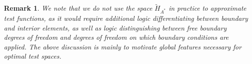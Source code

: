 \documentclass[11pt,onecolumn]{scrartcl}
\newcommand{\LRp}[1]{\left( #1 \right)}
\newcommand{\LRs}[1]{\left[ #1 \right]}
\newcommand{\LRa}[1]{\left\langle #1 \right\rangle}
\newcommand{\jump}[1] {\ensuremath{\LRs{\!\left[#1\right]\!}}}
\newcommand{\uh}{\widehat{u}}
\newcommand{\Gh}{\Gamma_h}
\newtheorem{remark}{Remark}
\begin{document}
\begin{remark}
We note that we do not use the space $\tilde{H}_{A^*}$ in practice to approximate test functions, as it would require additional logic differentiating between boundary and interior elements, as well as logic distinguishing between free boundary degrees of freedom and degrees of freedom on which boundary conditions are applied. The above discussion is mainly to motivate global features necessary for optimal test spaces.
\end{remark}

%
%
%
\end{document}
